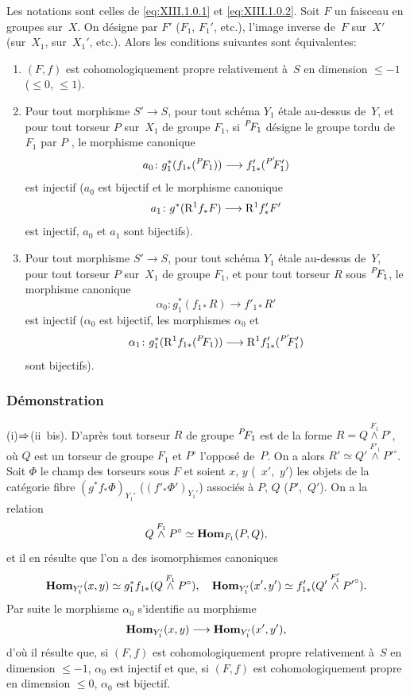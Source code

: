 \begin{subproposition}
\label{XIII.1.3.1}
Les notations sont celles de \eqref{eq:XIII.1.0.1} et
\eqref{eq:XIII.1.0.2}. Soit $F$ un faisceau en groupes sur~$X$. On
d\'esigne par $F'$ (\resp $F_1$, \resp $F_1'$, etc.), l'image
inverse de~$F$ sur~$X'$ (\resp sur~$X_1$, \resp sur~$X_1'$,
etc.). Alors les conditions suivantes sont \'equivalentes:
\begin{enumerate}
\item[(i)] $(F,f)$ est cohomologiquement propre relativement \`a~$S$
en dimension $\leqslant -1$ (\resp $\leqslant 0$, \resp $\leqslant
1$).
\item[(ii)] Pour tout morphisme $S' \to S$, pour tout sch\'ema $Y_1$
\'etale au-dessus de~$Y$, et pour tout torseur $P$ sur~$X_1$ de
groupe $F_1$, si $\leftexp{P\mkern-4mu}{F}_1$ d\'esigne le groupe tordu de
$F_1$ par $P$ \textup{\cite[II 4.1.2.3]{XIII.1}}, le morphisme canonique
$$
a_0 \colon g_1^*(f_{1 *}(\leftexp{P\mkern-4mu}{F}_1)) \to f'_{1
*}(\leftexp{P'\mkern-6mu}{F}'_1)
$$
est injectif (\resp $a_0$ est bijectif et le morphisme canonique
$$
a_1 \colon g^*(\R^1 f_* F) \to \R^1 f'_* F'
$$
est
injectif, \resp $a_0$ et $a_1$ sont bijectifs).
\item[(ii~bis)] Pour tout morphisme $S' \to S$, pour tout sch\'ema
$Y_1$ \'etale au-dessus de~$Y$, pour tout torseur $P$ sur~$X_1$ de
groupe $F_1$, et pour tout torseur $R$ sous $\leftexp{P\mkern-4mu}{F}_1$, le
morphisme canonique
$$
\alpha_0 \colon g_1^*(f_{1 *}R) \to f'_{1 *} R'
$$
est injectif (\resp $\alpha_0$ est bijectif, \resp les morphismes
$\alpha_0$ et
$$
\alpha_1 \colon g_1^*(\R^1 f_{1 *}(\leftexp{P\mkern-4mu}{F}_1)) \to \R^1
f'_{1 *}(\leftexp{P'\mkern-6mu}{F}'_1)
$$
sont bijectifs).
\end{enumerate}
\end{subproposition}

\subsubsection*{D\'emonstration}
(i)$\To$(ii~bis). D'apr\`es \cite[II 4.2.5]{XIII.1} tout torseur $R$
de groupe $\leftexp{P\mkern-4mu}{F}_1$ est de la forme $R = Q
\overset{F_1}{\wedge} P^\circ$, o\`u $Q$ est un torseur de groupe
$F_1$ et $P^\circ$ l'oppos\'e de~$P$. On a alors $R' \simeq Q'
\overset{F'_1}{\wedge} {P'}^\circ$. Soit $\Phi$ le champ des torseurs
sous $F$ et soient $x$, $y$ (\resp~$x'$,~$y'$) les objets de la
cat\'egorie fibre $(g^* f_* \Phi)_{Y_1'}$ (\resp $(f'_*
\Phi')_{Y_1'}$) associ\'es \`a $P$, $Q$ (\resp $P'$,~$Q'$). On a
la relation
$$
Q\overset{F_1}{\wedge} P^\circ \simeq \operatorname{\mathbf{Hom}}_{F_1}(P,Q) \text{,}
$$
et il en r\'esulte que l'on a des isomorphismes canoniques
$$
\operatorname{\mathbf{Hom}}_{Y'_1}(x,y) \simeq g_1^* f_{1 *}(Q
\overset{F_1}{\wedge} P^\circ) \text{,}\quad \operatorname{\mathbf{Hom}}_{Y_1'}(x',y')
\simeq f'_{1 *}(Q' \overset{F'_1}{\wedge}{P'}^\circ)\text{.}
$$
Par suite le morphisme $\alpha_0$ s'identifie au morphisme
$$
\SheafHom_{Y'_1}(x,y) \to \SheafHom_{Y'_1}(x',y') \text{,}
$$
d'o\`u il r\'esulte que, si $(F,f)$ est cohomologiquement propre
relativement \`a~$S$ en dimension $\leqslant -1$, $\alpha_0$ est
injectif et que, si $(F,f)$ est cohomologiquement propre en dimension
$\leqslant 0$, $\alpha_0$ est bijectif.

